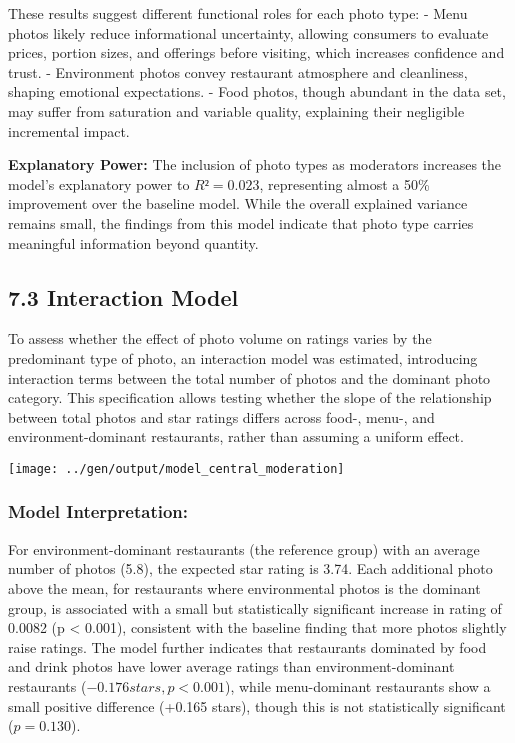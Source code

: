 \documentclass[
]{article}
\begin{document}
These results suggest different functional roles for each photo type: -
Menu photos likely reduce informational uncertainty, allowing consumers
to evaluate prices, portion sizes, and offerings before visiting, which
increases confidence and trust. - Environment photos convey restaurant
atmosphere and cleanliness, shaping emotional expectations. - Food
photos, though abundant in the data set, may suffer from saturation and
variable quality, explaining their negligible incremental impact.

\textbf{Explanatory Power:} The inclusion of photo types as moderators
increases the model's explanatory power to \(R² = 0.023\), representing
almost a 50\% improvement over the baseline model. While the overall
explained variance remains small, the findings from this model indicate
that photo type carries meaningful information beyond quantity.

\subsection{7.3 Interaction Model}\label{interaction-model}

To assess whether the effect of photo volume on ratings varies by the
predominant type of photo, an interaction model was estimated,
introducing interaction terms between the total number of photos and the
dominant photo category. This specification allows testing whether the
slope of the relationship between total photos and star ratings differs
across food-, menu-, and environment-dominant restaurants, rather than
assuming a uniform effect.

\texttt{[image: ../gen/output/model\_central\_moderation]}

\subsubsection{Model Interpretation:}\label{model-interpretation-2}

For environment-dominant restaurants (the reference group) with an
average number of photos (5.8), the expected star rating is 3.74. Each
additional photo above the mean, for restaurants where environmental
photos is the dominant group, is associated with a small but
statistically significant increase in rating of 0.0082 (p \textless{}
0.001), consistent with the baseline finding that more photos slightly
raise ratings. The model further indicates that restaurants dominated by
food and drink photos have lower average ratings than
environment-dominant restaurants (\(−0.176 stars, p < 0.001\)), while
menu-dominant restaurants show a small positive difference (+0.165
stars), though this is not statistically significant (\(p = 0.130\)).
\end{document}
